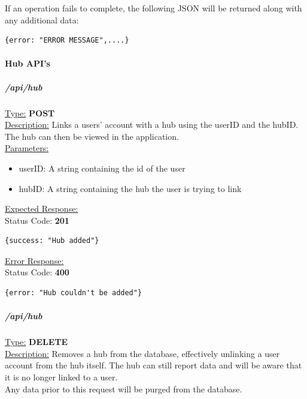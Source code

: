 \documentclass[preprint,12pt,3p]{elsarticle}
\newcommand{\forceindent}{\leavevmode{\parindent=1em\indent}}
\begin{document}
If an operation fails to complete, the following JSON will be returned along with any additional data:\\[5pt]
\begin{verbatim}
{error: "ERROR MESSAGE",....}
\end{verbatim}


\paragraph{Hub API's}
\subparagraph*{/api/hub}
\underline{Type:} \textbf{POST}\\

\underline{Description:} Links a users' account with a hub using the userID and the hubID. The hub can then be viewed in the application.\\

\underline{Parameters:}
\begin{itemize}
\item userID: A string containing the id of the user

\item hubID: A string containing the hub the user is trying to link
\end{itemize}
\underline{Expected Response:}\\[5pt]
\forceindent Status Code: \textbf{201} \\
\begin{verbatim}
{success: "Hub added"}
\end{verbatim}

\underline{Error Response:}\\[5pt]
\forceindent Status Code: \textbf{400} \\
\begin{verbatim}
{error: "Hub couldn't be added"}
\end{verbatim}



\subparagraph*{/api/hub}
\underline{Type:} \textbf{DELETE}\\

\underline{Description:} Removes a hub from the database, effectively unlinking a user account from the hub itself. The hub can still report data and will be aware that it is no longer linked to a user.\\
Any data prior to this request will be purged from the database.\\
\end{document}
